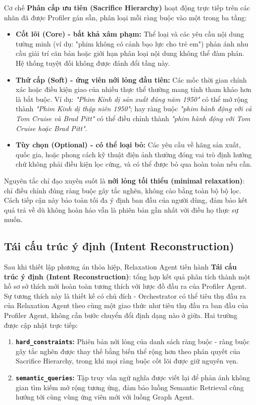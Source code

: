 Cơ chế \textbf{Phân cấp ưu tiên (Sacrifice Hierarchy)} hoạt động trực tiếp trên các nhãn đã được Profiler gán sẵn, phân loại mỗi ràng buộc vào một trong ba tầng:

\begin{itemize}
    \item \textbf{Cốt lõi (Core) - bất khả xâm phạm:} Thể loại và các yêu cầu nội dung tường minh (ví dụ: "phim không có cảnh bạo lực cho trẻ em") phản ánh nhu cầu giải trí căn bản hoặc giới hạn phân loại nội dung không thể đàm phán. Hệ thống tuyệt đối không được đánh đổi tầng này.
    \item \textbf{Thứ cấp (Soft) - ứng viên nới lỏng đầu tiên:} Các mốc thời gian chính xác hoặc điều kiện giao của nhiều thực thể thường mang tính tham khảo hơn là bắt buộc. Ví dụ: \textit{"Phim Kinh dị sản xuất đúng năm 1950"} có thể mở rộng thành \textit{"Phim Kinh dị thập niên 1950"}; hay ràng buộc \textit{"phim hành động với cả Tom Cruise và Brad Pitt"} có thể điều chỉnh thành \textit{"phim hành động với Tom Cruise hoặc Brad Pitt"}.
    \item \textbf{Tùy chọn (Optional) - có thể loại bỏ:} Các yêu cầu về hãng sản xuất, quốc gia, hoặc phong cách kỹ thuật điện ảnh thường đóng vai trò định hướng chứ không phải điều kiện lọc cứng, và có thể được bỏ qua hoàn toàn nếu cần.
\end{itemize}

Nguyên tắc chỉ đạo xuyên suốt là \textbf{nới lỏng tối thiểu (minimal relaxation)}: chỉ điều chỉnh đúng ràng buộc gây tắc nghẽn, không cào bằng toàn bộ bộ lọc. Cách tiếp cận này bảo toàn tối đa ý định ban đầu của người dùng, đảm bảo kết quả trả về dù không hoàn hảo vẫn là phiên bản gần nhất với điều họ thực sự muốn.

\subsection{Tái cấu trúc ý định (Intent Reconstruction)}
Sau khi thiết lập phương án thỏa hiệp, Relaxation Agent tiến hành \textbf{Tái cấu trúc ý định (Intent Reconstruction)}: tổng hợp kết quả phân tích thành một hồ sơ sở thích mới hoàn toàn tương thích với lược đồ đầu ra của Profiler Agent. Sự tương thích này là thiết kế có chủ đích - Orchestrator có thể tiêu thụ đầu ra của Relaxation Agent theo cùng một giao thức như tiêu thụ đầu ra ban đầu của Profiler Agent, không cần bước chuyển đổi định dạng nào ở giữa. Hai trường được cập nhật trực tiếp:

\begin{enumerate}
    \item \textbf{\texttt{hard\_constraints}:} Phiên bản nới lỏng của danh sách ràng buộc - ràng buộc gây tắc nghẽn được thay thế bằng biến thể rộng hơn theo phán quyết của Sacrifice Hierarchy, trong khi mọi ràng buộc cốt lõi được giữ nguyên vẹn.
    \item \textbf{\texttt{semantic\_queries}:} Tập truy vấn ngữ nghĩa được viết lại để phản ánh không gian tìm kiếm mở rộng tương ứng, đảm bảo luồng Semantic Retrieval cũng hướng tới cùng vùng ứng viên mới với luồng Graph Agent.
\end{enumerate}

